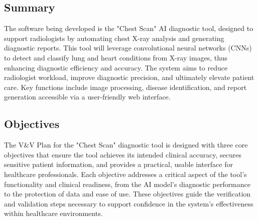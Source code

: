 \documentclass[12pt, titlepage]{article}
\begin{document}
\subsection{Summary}
The software being developed is the "Chest Scan" AI diagnostic tool, designed to support radiologists by automating chest X-ray analysis and generating diagnostic reports. This tool will leverage convolutional neural networks (CNNs) to detect and classify lung and heart conditions from X-ray images, thus enhancing diagnostic efficiency and accuracy. The system aims to reduce radiologist workload, improve diagnostic precision, and ultimately elevate patient care. Key functions include image processing, disease identification, and report generation accessible via a user-friendly web interface.

\subsection{Objectives}
The V\&V Plan for the "Chest Scan" diagnostic tool is designed with three core objectives that ensure the tool achieves its intended clinical accuracy, secures sensitive patient information, and provides a practical, usable interface for healthcare professionals. Each objective addresses a critical aspect of the tool's functionality and clinical readiness, from the AI model’s diagnostic performance to the protection of data and ease of use. These objectives guide the verification and validation steps necessary to support confidence in the system’s effectiveness within healthcare environments.
\end{document}
